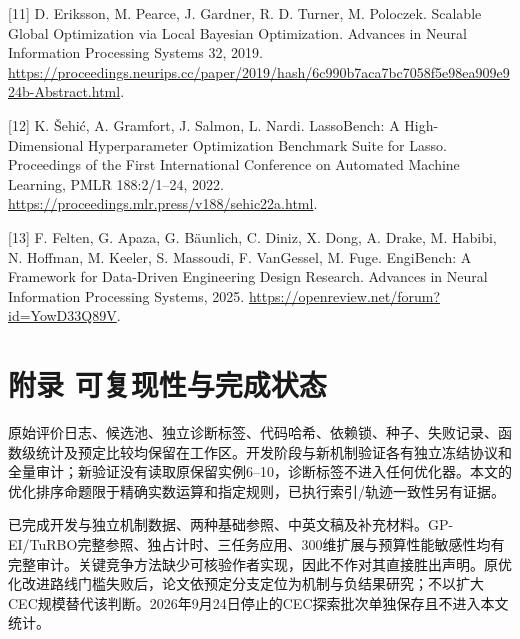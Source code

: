 \documentclass[11pt,a4paper]{article}
\begin{document}
{[}11{]} D. Eriksson, M. Pearce, J. Gardner, R. D. Turner, M. Poloczek.
Scalable Global Optimization via Local Bayesian Optimization. Advances
in Neural Information Processing Systems 32, 2019.
\url{https://proceedings.neurips.cc/paper/2019/hash/6c990b7aca7bc7058f5e98ea909e924b-Abstract.html}.

{[}12{]} K. Šehić, A. Gramfort, J. Salmon, L. Nardi. LassoBench: A
High-Dimensional Hyperparameter Optimization Benchmark Suite for Lasso.
Proceedings of the First International Conference on Automated Machine
Learning, PMLR 188:2/1--24, 2022.
\url{https://proceedings.mlr.press/v188/sehic22a.html}.

{[}13{]} F. Felten, G. Apaza, G. Bäunlich, C. Diniz, X. Dong, A. Drake,
M. Habibi, N. Hoffman, M. Keeler, S. Massoudi, F. VanGessel, M. Fuge.
EngiBench: A Framework for Data-Driven Engineering Design Research.
Advances in Neural Information Processing Systems, 2025.
\url{https://openreview.net/forum?id=YowD33Q89V}.

\hypertarget{ux9644ux5f55-ux53efux590dux73b0ux6027ux4e0eux5b8cux6210ux72b6ux6001}{%
\section{附录
可复现性与完成状态}\label{ux9644ux5f55-ux53efux590dux73b0ux6027ux4e0eux5b8cux6210ux72b6ux6001}}

原始评价日志、候选池、独立诊断标签、代码哈希、依赖锁、种子、失败记录、函数级统计及预定比较均保留在工作区。开发阶段与新机制验证各有独立冻结协议和全量审计；新验证没有读取原保留实例6--10，诊断标签不进入任何优化器。本文的优化排序命题限于精确实数运算和指定规则，已执行索引/轨迹一致性另有证据。

已完成开发与独立机制数据、两种基础参照、中英文稿及补充材料。GP-EI/TuRBO完整参照、独占计时、三任务应用、300维扩展与预算性能敏感性均有完整审计。关键竞争方法缺少可核验作者实现，因此不作对其直接胜出声明。原优化改进路线门槛失败后，论文依预定分支定位为机制与负结果研究；不以扩大CEC规模替代该判断。2026年9月24日停止的CEC探索批次单独保存且不进入本文统计。
\end{document}
